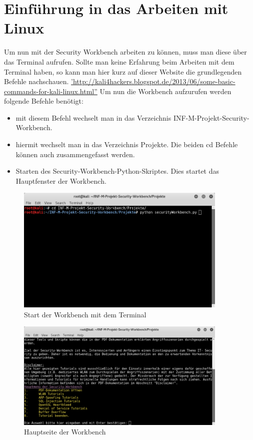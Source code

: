 \section{Einführung in das Arbeiten mit Linux}
\label{section_startWorkbench}
Um nun mit der Security Workbench arbeiten zu können, muss man diese über das Terminal aufrufen.
Sollte man keine Erfahrung beim Arbeiten mit dem Terminal haben, so kann man hier kurz auf dieser Website die grundlegenden Befehle nachschauen.
\hyperref[Basic Commands]{'http://kali4hackers.blogspot.de/2013/06/some-basic-commands-for-kali-linux.html''}
Um nun die Workbench aufzurufen werden folgende Befehle benötigt:
\begin{itemize}
	\item {} mit diesem Befehl wechselt man in das Verzeichnis INF-M-Projekt-Security-Workbench.
	\item {} hiermit wechselt man in das Verzeichnis Projekte. Die beiden cd Befehle können auch zusammengefasst werden. 
	\item {} Starten des Security-Workbench-Python-Skriptes. Dies startet das Hauptfenster der Workbench.
\end{itemize}

	\begin{figure}[H]
		\centering
		\includegraphics[width=0.9\textwidth]{images/prep/start_the_workbench.png}
		\caption{Start der Workbench mit dem Terminal}
		\label{fig:start workbench with terminal}
	\end{figure}

	\begin{figure}[H]
		\centering
		\includegraphics[width=0.9\textwidth]{images/prep/mainwindow_workbench.png}
		\caption{Hauptseite der Workbench}
		\label{fig:maindindow workbench}
	\end{figure}

